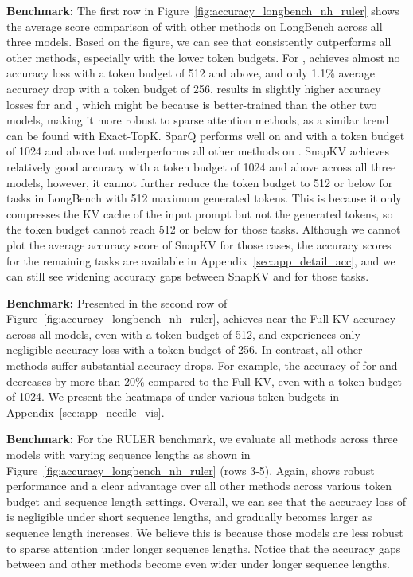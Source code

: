 \textbf{\longbench Benchmark:}
The first row in Figure~\ref{fig:accuracy_longbench_nh_ruler} shows the average score comparison of \rocketkv with other methods on LongBench across all three models. Based on the figure, we can see that \rocketkv consistently outperforms all other methods, especially with the lower token budgets. For \llama, \rocketkv achieves almost no accuracy loss with a token budget of 512 and above, and only 1.1\% average accuracy drop with a token budget of 256. \rocketkv results in slightly higher accuracy losses for \mistral and \longchat, which might be because \llama is better-trained than the other two models, making it more robust to sparse attention methods, as a similar trend can be found with Exact-TopK. SparQ performs well on \llama and \longchat with a token budget of 1024 and above but underperforms all other methods on \mistral. SnapKV achieves relatively good accuracy with a token budget of 1024 and above across all three models, however, it cannot further reduce the token budget to 512 or below for tasks in LongBench with 512 maximum generated tokens. This is because it only compresses the KV cache of the input prompt but not the generated tokens, so the token budget cannot reach 512 or below for those tasks. Although we cannot plot the average accuracy score of SnapKV for those cases, the accuracy scores for the remaining tasks are available in Appendix~\ref{sec:app_detail_acc}, and we can still see widening accuracy gaps between SnapKV and \rocketkv for those tasks.



\textbf{\needle Benchmark:}
Presented in the second row of Figure~\ref{fig:accuracy_longbench_nh_ruler}, \rocketkv achieves near the Full-KV accuracy across all models, even with a token budget of 512, and experiences only negligible accuracy loss with a token budget of 256. In contrast, all other methods suffer substantial accuracy drops. For example, the accuracy of \snapkv for \mistral and \longchat decreases by more than 20\% compared to the Full-KV, even with a token budget of 1024. We present the heatmaps of \rocketkv under various token budgets in Appendix~\ref{sec:app_needle_vis}. 


\textbf{ Benchmark:}
For the RULER benchmark, we evaluate all methods across three models with varying sequence lengths as shown in Figure~\ref{fig:accuracy_longbench_nh_ruler} (rows 3-5). Again, \rocketkv shows robust performance and a clear advantage over all other methods across various token budget and sequence length settings. Overall, we can see that the accuracy loss of \rocketkv is negligible under short sequence lengths, and gradually becomes larger as sequence length increases. We believe this is because those models are less robust to sparse attention under longer sequence lengths. Notice that the accuracy gaps between \rocketkv and other methods become even wider under longer sequence lengths.  










